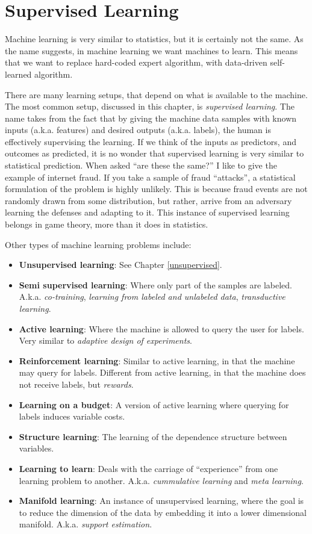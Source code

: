 \documentclass[]{book}
\providecommand{\tightlist}{%
  \setlength{\itemsep}{0pt}\setlength{\parskip}{0pt}}
\theoremstyle{definition}
\theoremstyle{definition}
\theoremstyle{remark}
\begin{document}
\chapter{Supervised Learning}\label{supervised}

Machine learning is very similar to statistics, but it is certainly not
the same. As the name suggests, in machine learning we want machines to
learn. This means that we want to replace hard-coded expert algorithm,
with data-driven self-learned algorithm.

There are many learning setups, that depend on what is available to the
machine. The most common setup, discussed in this chapter, is
\emph{supervised learning}. The name takes from the fact that by giving
the machine data samples with known inputs (a.k.a. features) and desired
outputs (a.k.a. labels), the human is effectively supervising the
learning. If we think of the inputs as predictors, and outcomes as
predicted, it is no wonder that supervised learning is very similar to
statistical prediction. When asked ``are these the same?'' I like to
give the example of internet fraud. If you take a sample of fraud
``attacks'', a statistical formulation of the problem is highly
unlikely. This is because fraud events are not randomly drawn from some
distribution, but rather, arrive from an adversary learning the defenses
and adapting to it. This instance of supervised learning belongs in game
theory, more than it does in statistics.

Other types of machine learning problems include:

\begin{itemize}
\tightlist
\item
  \textbf{Unsupervised learning}: See Chapter \ref{unsupervised}.
\item
  \textbf{Semi supervised learning}: Where only part of the samples are
  labeled. A.k.a. \emph{co-training}, \emph{learning from labeled and
  unlabeled data}, \emph{transductive learning}.
\item
  \textbf{Active learning}: Where the machine is allowed to query the
  user for labels. Very similar to \emph{adaptive design of
  experiments}.
\item
  \textbf{Reinforcement learning}: Similar to active learning, in that
  the machine may query for labels. Different from active learning, in
  that the machine does not receive labels, but \emph{rewards}.
\item
  \textbf{Learning on a budget}: A version of active learning where
  querying for labels induces variable costs.
\item
  \textbf{Structure learning}: The learning of the dependence structure
  between variables.
\item
  \textbf{Learning to learn}: Deals with the carriage of ``experience''
  from one learning problem to another. A.k.a. \emph{cummulative
  learning} and \emph{meta learning}.
\item
  \textbf{Manifold learning}: An instance of unsupervised learning,
  where the goal is to reduce the dimension of the data by embedding it
  into a lower dimensional manifold. A.k.a. \emph{support estimation}.
\end{itemize}
\end{document}
